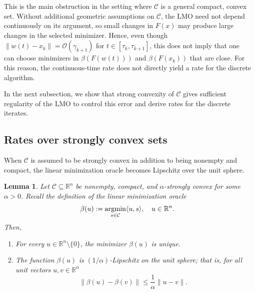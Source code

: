 \documentclass[pdflatex,sn-mathphys-num]{sn-jnl}%
\newcommand\argmin{\mathop{\rm argmin}}
\newcommand\C{\mathcal{C}}
\theoremstyle{thmstyleone}%
\newtheorem{lemma}[theorem]{Lemma}%
\theoremstyle{thmstyletwo}%
\theoremstyle{thmstylethree}%
\begin{document}
This is the main obstruction in the setting where $\C$ is a general compact, convex set.
Without additional geometric assumptions on $\C$, the LMO need not
depend continuously on its argument, so small changes in $F(x)$ may produce large changes in the selected minimizer. Hence, even though
$\|w(t)-x_k\| = \mathcal O(\gamma_{k+1})$
for $t \in [\tau_k,\tau_{k+1}]$, this does not imply that one can choose minimizers in $\beta(F(w(t)))$ and $\beta(F(x_k))$ that are close.
For this reason, the continuous-time rate does not directly yield a rate for the discrete algorithm.

In the next subsection, we show that strong convexity of $\C$ gives sufficient regularity of the LMO
to control this error and derive rates for the discrete iterates.

\subsection{Rates over strongly convex sets}
When $\C$ is assumed to be strongly convex in addition to being nonempty and compact, the linear minimization oracle becomes
Lipschitz over the unit sphere.
\begin{lemma} \label{lem:lmo-lipschitz}
  Let $\C \subseteq \mathbb{R}^n$ be nonempty, compact, and $\alpha$-strongly convex for some $\alpha > 0$. Recall the definition of the linear minimization oracle
  \[
    \beta(u) := \argmin_{s\in\C}\langle{u, s}\rangle,\quad u \in \mathbb{R}^n.
  \]
  Then,
  \begin{enumerate}[label=(\roman*)]
      \item For every $u \in \mathbb{R}^n\setminus\{0\}$, the minimizer $\beta(u)$ is unique.
      \item The function $\beta(u)$ is $(1/\alpha)$-Lipschitz on the unit sphere; that is, for all unit vectors $u,v \in \mathbb{R}^n$
      \begin{equation} \label{eq:lmo-lip}
          \lVert \beta(u) - \beta(v)\rVert \leq \frac{1}{\alpha}\lVert u - v\rVert.
      \end{equation}
  \end{enumerate}
\end{lemma}
\end{document}
